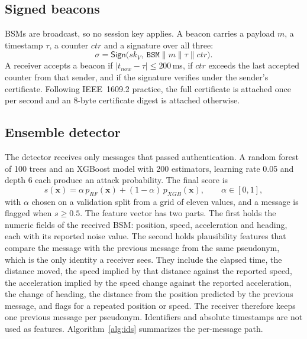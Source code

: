 \documentclass[journal,twoside]{IEEEtran}
\begin{document}
\subsection{Signed beacons}

BSMs are broadcast, so no session key applies. A beacon carries a payload $m$, a timestamp $\tau$, a counter $ctr$ and a signature over all three:
\begin{equation}
\sigma=\mathsf{Sign}\bigl(sk_V,\ \texttt{BSM}\|m\|\tau\|ctr\bigr).
\label{eq:bsm}
\end{equation}
A receiver accepts a beacon if $|t_{now}-\tau|\le 200$\,ms, if $ctr$ exceeds the last accepted counter from that sender, and if the signature verifies under the sender's certificate. Following IEEE~1609.2 practice, the full certificate is attached once per second and an 8-byte certificate digest is attached otherwise.

\subsection{Ensemble detector}

The detector receives only messages that passed authentication. A random forest of 100 trees and an XGBoost model with 200 estimators, learning rate 0.05 and depth 6 each produce an attack probability. The final score is
\begin{equation}
s(\mathbf{x})=\alpha\,p_{RF}(\mathbf{x})+(1-\alpha)\,p_{XGB}(\mathbf{x}),\qquad \alpha\in[0,1],
\label{eq:ens}
\end{equation}
with $\alpha$ chosen on a validation split from a grid of eleven values, and a message is flagged when $s\ge 0.5$. The feature vector has two parts. The first holds the numeric fields of the received BSM: position, speed, acceleration and heading, each with its reported noise value. The second holds plausibility features that compare the message with the previous message from the same pseudonym, which is the only identity a receiver sees. They include the elapsed time, the distance moved, the speed implied by that distance against the reported speed, the acceleration implied by the speed change against the reported acceleration, the change of heading, the distance from the position predicted by the previous message, and flags for a repeated position or speed. The receiver therefore keeps one previous message per pseudonym. Identifiers and absolute timestamps are not used as features. Algorithm~\ref{alg:ids} summarizes the per-message path.
\end{document}
